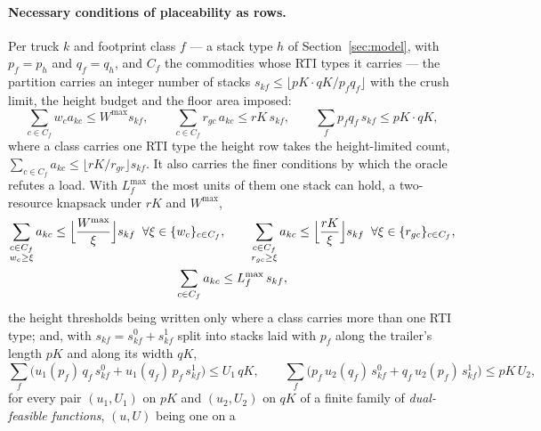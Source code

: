 \paragraph{Necessary conditions of placeability as rows.}
Per truck $k$ and footprint class $f$ --- a stack type $h$ of
Section~\ref{sec:model}, with $p_{f}=p_{h}$ and $q_{f}=q_{h}$, and
$C_{f}$ the commodities whose RTI types it carries --- the partition
carries an integer number of stacks
$s_{kf}\le\lfloor pK\cdot qK/p_{f}q_{f}\rfloor$ with the crush limit,
the height budget and the floor area imposed:
\begin{equation}
\sum_{c\in C_{f}}w_{c}a_{kc}\le W^{\max}s_{kf},
\qquad
\sum_{c\in C_{f}}r_{gc}\,a_{kc}\le rK\,s_{kf},
\qquad
\sum_{f}p_{f}q_{f}\,s_{kf}\le pK\cdot qK ,
\label{eq:stackrows}
\end{equation}
where a class carries one RTI type the height row takes the
height-limited count, $\sum_{c\in C_{f}}a_{kc}\le\lfloor
rK/r_{gr}\rfloor s_{kf}$. It also carries the finer conditions by which
the oracle refutes a load. With $L^{\max}_{f}$ the most units of them one stack can hold, a
two-resource knapsack under $rK$ and $W^{\max}$,
\begin{equation}
\begin{gathered}
\sum_{\substack{c\in C_{f}\\ w_{c}\ge\xi}}a_{kc}\le
  \Bigl\lfloor\frac{W^{\max}}{\xi}\Bigr\rfloor s_{kf}
  \;\;\forall\xi\in\{w_{c}\}_{c\in C_{f}},
\qquad
\sum_{\substack{c\in C_{f}\\ r_{gc}\ge\xi}}a_{kc}\le
  \Bigl\lfloor\frac{rK}{\xi}\Bigr\rfloor s_{kf}
  \;\;\forall\xi\in\{r_{gc}\}_{c\in C_{f}},
\\
\sum_{c\in C_{f}}a_{kc}\le L^{\max}_{f}\,s_{kf},
\end{gathered}
\label{eq:geomrows}
\end{equation}
the height thresholds being written only where a class carries more
than one RTI type; and, with $s_{kf}=s^{0}_{kf}+s^{1}_{kf}$ split into
stacks laid with $p_{f}$ along the trailer's length $pK$ and along its
width $qK$,
\begin{equation}
\sum_{f}\bigl(u_{1}(p_{f})\,q_{f}\,s^{0}_{kf}+u_{1}(q_{f})\,p_{f}\,s^{1}_{kf}\bigr)
  \le U_{1}\,qK,
\qquad
\sum_{f}\bigl(p_{f}\,u_{2}(q_{f})\,s^{0}_{kf}+q_{f}\,u_{2}(p_{f})\,s^{1}_{kf}\bigr)
  \le pK\,U_{2},
\label{eq:fibrerows}
\end{equation}
for every pair $(u_{1},U_{1})$ on $pK$ and $(u_{2},U_{2})$ on $qK$ of a
finite family of \emph{dual-feasible functions}, $(u,U)$ being one on a
